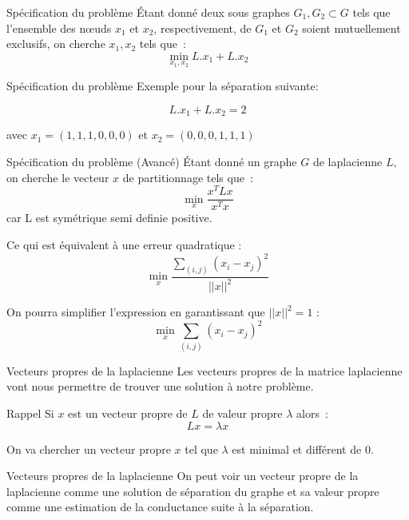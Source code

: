 \begin{frame}{Spécification du problème}
    Étant donné deux sous graphes $G_1,G_2 \subset G$ tels que l'ensemble des nœuds $x_1$ et $x_2$, respectivement, de $G_1$ et $G_2$ soient mutuellement exclusifs, on cherche $x_1, x_2$ tels que~:
    $$
        \min_{x_1, x_2} L.x_1 + L.x_2
    $$
\end{frame}

\begin{frame}{Spécification du problème}
    Exemple pour la séparation suivante:


    $$
        L.x_1 + L.x_2 = 2
    $$

    avec $x_1 = (1,1,1,0,0,0)$ et $x_2 = (0,0,0,1,1,1)$
\end{frame}

\begin{frame}{Spécification du problème (Avancé)}
    Étant donné un graphe $G$ de laplacienne $L$, on cherche le vecteur $x$ de partitionnage tels que~:
    $$
        \min_{x} \frac{x^T L x}{x^T x}
    $$
    car L est symétrique semi definie positive.

    Ce qui est équivalent à une erreur quadratique :
    $$
        \min_x \frac{\sum_{(i,j)}(x_i-x_j)^2}{||x||^2}
    $$
    
    On pourra simplifier l'expression en garantissant que $||x||^2 = 1$ :
    $$
        \min_x \sum_{(i,j)}(x_i-x_j)^2
    $$
\end{frame}



\begin{frame}{Vecteurs propres de la laplacienne}
    Les vecteurs propres de la matrice laplacienne vont nous permettre de trouver une solution à notre problème.
    
    \begin{alertblock}{Rappel}
        Si $x$ est un vecteur propre de $L$ de valeur propre $\lambda$ alors~:
        $$
            Lx = \lambda x
        $$
    \end{alertblock} 

    On va chercher un vecteur propre $x$ tel que $\lambda$ est minimal et différent de 0.
\end{frame}

\begin{frame}{Vecteurs propres de la laplacienne}
    On peut voir un vecteur propre de la laplacienne comme une solution de séparation du graphe et sa valeur propre comme une estimation de la conductance suite à la séparation.
\end{frame}

